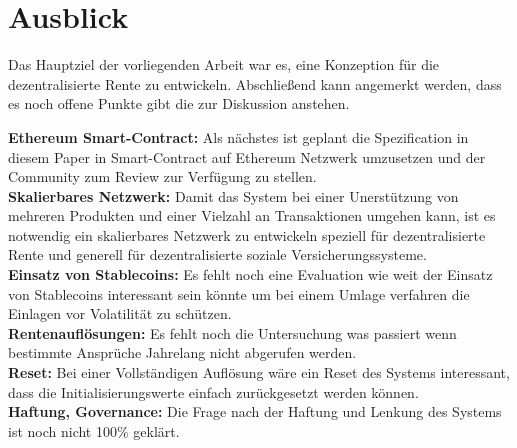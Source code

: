 \section{Ausblick}

Das Hauptziel der vorliegenden Arbeit war es, eine Konzeption für die dezentralisierte Rente zu entwickeln. Abschließend kann angemerkt werden, dass es noch offene Punkte gibt die zur Diskussion anstehen.


\textbf{Ethereum Smart-Contract:} Als nächstes ist geplant die Spezification in diesem Paper in Smart-Contract auf Ethereum Netzwerk umzusetzen und der Community zum Review zur Verfügung zu stellen.\\
\textbf{Skalierbares Netzwerk:} Damit das System bei einer Unerstützung von mehreren Produkten und einer Vielzahl an Transaktionen umgehen kann, ist es notwendig ein skalierbares Netzwerk zu entwickeln speziell für dezentralisierte Rente und generell für dezentralisierte soziale Versicherungssysteme.\\
\textbf{Einsatz von Stablecoins:} Es fehlt noch eine Evaluation wie weit der Einsatz von Stablecoins interessant sein könnte um bei einem Umlage verfahren die Einlagen vor Volatilität zu schützen.\\
\textbf{Rentenauflösungen:} Es fehlt noch die Untersuchung was passiert wenn bestimmte Ansprüche Jahrelang nicht abgerufen werden.\\
\textbf{Reset:} Bei einer Vollständigen Auflösung wäre ein Reset des Systems interessant, dass die Initialisierungswerte einfach zurückgesetzt werden können.\\
\textbf{Haftung, Governance:} Die Frage nach der Haftung und Lenkung des Systems ist noch nicht 100\% geklärt.

